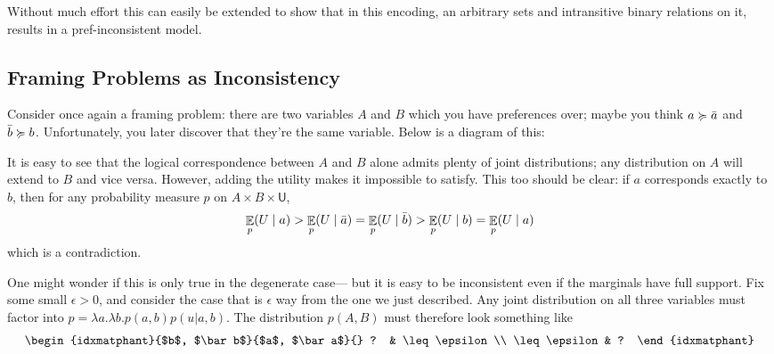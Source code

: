 \documentclass{article}
\begin{document}
	Without much effort this can easily be extended to show that in this encoding, an arbitrary sets and intransitive binary relations on it, results in a pref-inconsistent model.




	
	\subsection{Framing Problems as Inconsistency}
	Consider once again a framing problem: there are two variables $A$ and $B$ which you have preferences over; maybe you think $a \succcurlyeq \bar a$ and $\bar b \succcurlyeq b$. Unfortunately, you later discover that they're the same variable. Below is a diagram of this:
	\begin{center}
	\end{center}
	It is easy to see that the logical correspondence between $A$ and $B$ alone admits plenty of joint distributions; any distribution on $A$ will extend to $B$ and vice versa. However, adding the utility makes it impossible to satisfy. This too should be clear: if $a$ corresponds exactly to $b$, then for any probability measure $p$ on $A \times B \times \mathsf U$,
	\[ \mathop{\mathbb E}_p(U \mid a) > \mathop{\mathbb E}_p(U \mid \bar a) = \mathop{\mathbb E}_p(U \mid \bar b) > \mathop{\mathbb E}_p(U \mid b) = \mathop{\mathbb E}_p(U \mid a) \]
	which is a contradiction.
	
	One might wonder if this is only true in the degenerate case--- but it is easy to be inconsistent even if the marginals have full support. Fix some small $\epsilon > 0$, and consider the case that is $\epsilon$ way from the one we just described. 
	Any joint distribution on all three variables must factor into $p = \lambda a. \lambda b. p(a, b) p(u | a,b)$. The distribution $p(A, B)$ must therefore look something like
	\[ \begin{idxmatphant}{$b$, $\bar b$}{$a$, $\bar a$}{} ? & \leq\epsilon \\ \leq\epsilon & ?
	\end{idxmatphant}\]
	
\end{document}
